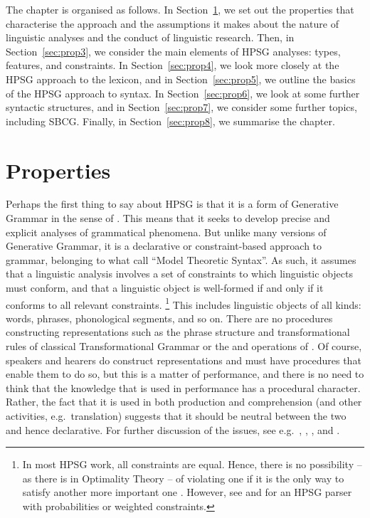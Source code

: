 \documentclass[output=paper
	        ,collection
	        ,collectionchapter
 	        ,biblatex
                ,babelshorthands
                ,newtxmath
                ,draftmode
                ,colorlinks, citecolor=brown
]{langscibook}
\begin{document}
The chapter is organised as follows. In Section~\ref{sec:prop2}, we set out the properties that
characterise the approach and the assumptions it makes about the nature of linguistic analyses and
the conduct of linguistic research. Then, in Section~\ref{sec:prop3}, we consider the main elements
of HPSG analyses: types, features, and constraints. In Section~\ref{sec:prop4}, we look more closely
at the HPSG approach to the lexicon, and in Section~\ref{sec:prop5}, we outline the basics of the
HPSG approach to syntax. In Section~\ref{sec:prop6}, we look at some further syntactic structures,
and in Section~\ref{sec:prop7}, we consider some further topics, including SBCG. Finally, in
Section~\ref{sec:prop8}, we summarise the chapter. 


\section{Properties}\label{sec:prop2}
\label{prop:sec-properties}

Perhaps the first thing to say about HPSG is that it is a form of Generative Grammar in the sense of
\citet[]{Chomsky65a}. This means that it seeks to develop precise and explicit analyses of
grammatical phenomena. But unlike many versions of Generative Grammar, it is a declarative or
constraint-based approach to grammar, belonging to what \citet{PS2001a} call ``Model Theoretic
Syntax''. As such, it assumes that a linguistic analysis involves a set of constraints to which
linguistic objects must conform, and that a linguistic object is well-formed if and only if it
conforms to all relevant constraints.%
%
\footnote{In most HPSG work, all constraints are equal. Hence, there is no possibility -- as there
  is in Optimality Theory \citep{PS2004a-u} -- of violating one if it is the only way to satisfy another more
  important one \citep{Malouf2003a}. However, see  and  for an
  HPSG parser with probabilities or weighted constraints.} 
%
This includes linguistic objects of all kinds: words, phrases, phonological segments, and so
on. There are no procedures constructing representations such as the phrase structure and
transformational rules of classical Transformational Grammar or the  and  operations of
. Of course, speakers and hearers do construct representations and must have procedures
that enable them to do so, but this is a matter of performance, and there is no need to think that
the knowledge that is used in performance has a procedural character. Rather, the fact that it is
used in both production and comprehension (and other activities, e.g.\ translation) suggests that it
should be neutral between the two and hence declarative. For further discussion of the issues, see
e.g.\ \citet{PS2001a}, \citet{Postal2003a}, \citet{SW2011a,SW2015a}, and
. 
\end{document}
